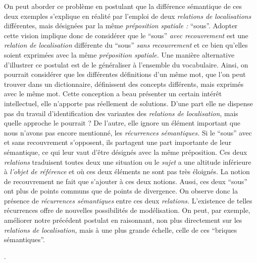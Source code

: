 On peut aborder ce problème en postulant que la différence sémantique
de ces deux exemples s'explique en réalité par l’emploi de deux
\emph{relations de localisations} différentes, mais désignées par la
même \emph{préposition spatiale :} \enquote{sous}. Adopter cette
vision implique donc de considérer que le \enquote{sous} \emph{avec
  recouvrement} est une \emph{relation de localisation} différente du
\enquote{sous} \emph{sans recouvrement} et ce bien qu'elles soient
exprimées avec la même \emph{préposition spatiale.} Une manière
alternative d'illustrer ce postulat est de le généraliser à l'ensemble
du vocabulaire. Ainsi, on pourrait considérer que les différentes
définitions d'un même mot, que l'on peut trouver dans un dictionnaire,
définissent des concepts différents, mais exprimés avec le même
mot. Cette conception a beau présenter un certain intérêt
intellectuel, elle n'apporte pas réellement de solutions. D'une part
elle ne dispense pas du travail d’identification des variantes des
\emph{relations de localisation,} mais quelle approche le pourrait ?
De l'autre, elle ignore un élément important que nous n'avons pas
encore mentionné, les \emph{récurrences sémantiques.} Si le
\enquote{sous} avec et sans recouvrement s'opposent, ils partagent une
part importante de leur sémantique, ce qui leur vaut d'être désignés
avec la même préposition. Ces deux \emph{relations} traduisent toutes
deux une situation ou le \emph{sujet} a une altitude inférieure à
\emph{l'objet de référence} et où ces deux éléments ne sont pas très
éloignés. La notion de recouvrement ne fait que s'ajouter à ces deux
notions. Aussi, ces deux \enquote{sous} ont plus de points communs que
de points de divergence. On observe donc la présence de
\emph{récurrences sémantiques} entre ces deux \emph{relations.}
L’existence de telles récurrences offre de nouvelles possibilités de
modélisation. On peut, par exemple, améliorer notre précédent postulat
en raisonnant, non plus directement sur les \emph{relations de
  localisation,} mais à une plus grande échelle, celle de ces
\enquote{briques sémantiques}.


\autocite{Bunel2019a}.

